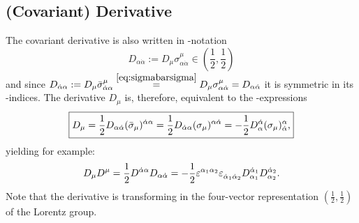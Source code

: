\subsection{(Covariant) Derivative} \label{sec:covariantDerivative}
The covariant derivative is also written in \SLtwoC{}-notation
\begin{equation}
	D_{\alpha \dot{\alpha}} := D_{\mu} \sigma^{\mu}_{\alpha \dot{\alpha}} \in (\frac{1}{2}, \frac{1}{2})
\end{equation}
and since $ D_{\dot{\alpha} \alpha} := D_{\mu} \bar{\sigma}^{\mu}_{\dot{\alpha} \alpha} \stackrel{\eqref{eq:sigmabarsigma}}{=} D_{\mu} \sigma^{\mu}_{\alpha \dot{\alpha}} = D_{\alpha \dot{\alpha}} $ it is symmetric in its \SLtwoC{}-indices.
The derivative $ D_{\mu} $ is, therefore, equivalent to the \SLtwoC{}-expressions
\begin{equation}
	\begin{aligned}
		\boxed{
			D_{\mu} = \frac{1}{2} D_{\alpha \dot{\alpha}} \tensor{(\bar{\sigma}_{\mu})}{^{\dot{\alpha} \alpha}}
			= \frac{1}{2} D_{\dot{\alpha} \alpha} \tensor{(\sigma_{\mu})}{^{\alpha \dot{\alpha}}}
			= - \frac{1}{2} D^{\dot{\alpha}}_{\alpha} \tensor*{(\sigma_{\mu})}{^{\alpha}_{\dot{\alpha}}}
			\text{,}
		}
	\end{aligned}
\end{equation}
yielding for example:
\begin{equation}
	\begin{aligned}
		D_{\mu} D^{\mu}
		= \frac{1}{2} D^{\dot{\alpha} \alpha} D_{\alpha \dot{\alpha}}
		= - \frac{1}{2} \tensor{\eps}{^{\alpha_{1} \alpha_{2}}} \tensor{\eps}{_{\dot{\alpha}_{1} \dot{\alpha}_{2}}} \tensor*{\cov}{^{\dot{\alpha}_{1}}_{\alpha_{1}}} \tensor*{\cov}{^{\dot{\alpha}_{2}}_{\alpha_{2}}}
		\text{.}
	\end{aligned}
\end{equation}
Note that the derivative is transforming in the four-vector representation $ (\tfrac{1}{2}, \tfrac{1}{2}) $ of the Lorentz group.
